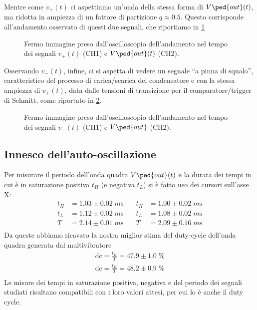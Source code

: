 \documentclass[10pt, a4paper, italian]{article}
\begin{document}
Mentre come $v_+ (t)$ ci aspettiamo un'onda della stessa forma di
$V\ped{out} (t)$, ma ridotta in ampiezza di un fattore di partizione
$q \approx 0.5$. Questo corrisponde all'andamento osservato di questi due
segnali, che riportiamo in \cref{fig: v+vout}
\begin{figure}[htbp]
	\centering
	\caption{Fermo immagine preso dall'oscilloscopio dell'andamento nel tempo dei
	segnali $v_+ (t)$ (CH1) e $V\ped{out} (t)$ (CH2). \label{fig: v+vout}}
\end{figure}

Osservando $v_- (t)$, infine, ci si aspetta di vedere un segnale ``a pinna di
squalo'', caratteristico del processo di carica/scarica del condensatore e
con la stessa ampiezza di $v_+ (t)$, data dalle tensioni di transizione per
il comparatore/trigger di Schmitt, come riportato in \cref{fig: v-vout}.
\begin{figure}[htbp]
	\centering
	\caption{Fermo immagine preso dall'oscilloscopio dell'andamento nel tempo dei
	segnali $v_- (t)$ (CH1) e $V\ped{out}$ (CH2). \label{fig: v-vout}}
\end{figure}

\subsection{Innesco dell'auto-oscillazione}
Per misurare il periodo dell'onda quadra $V\ped{out} (t)$ e la durata dei
tempi in cui è in saturazione positiva $t_H$ (e negativa $t_L$) si è fatto
uso dei cursori sull'asse X:
\begin{align*}
t_H &= 1.03 \pm 0.02 \; \si{m\s} &\quad t_H &= 1.00 \pm 0.02 \; \si{m\s} \\
t_L &= 1.12 \pm 0.02 \; \si{m\s} &\quad t_L &= 1.08 \pm 0.02 \; \si{m\s} \\
T &= 2.14 \pm 0.01 \; \si{m\s}  &\quad T &= 2.09 \pm 0.16 \; \si{m\s} \\
\end{align*}
Da queste abbiamo ricavato la nostra miglior stima del duty-cycle dell'onda
quadra generata dal multivibratore
\begin{align*}
\mathrm{dc} = \frac{t_H}{T} = 47.9 \pm 1.0 \; \% \\
\mathrm{dc} = \frac{t_H}{T} = 48.2 \pm 0.9 \; \% \\
\end{align*}
Le misure dei tempi in saturazione positiva, negativa e del periodo dei
segnali studiati risultano compatibili con i loro valori attesi, per cui
lo è anche il duty cycle.
\end{document}
